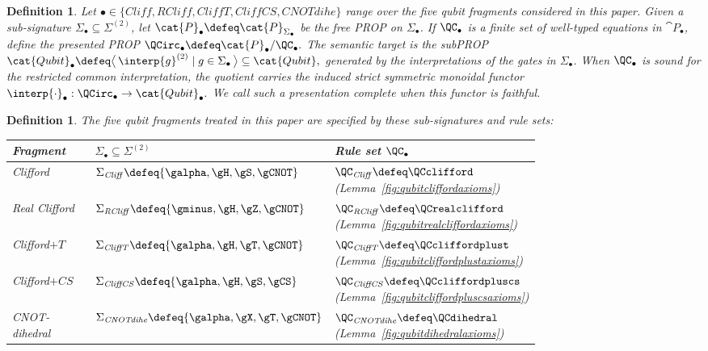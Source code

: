 \documentclass[10pt,a4paper]{article}
\newtheorem{definition}[theorem]{Definition}
\def\cref#1{Lemma~\ref{#1}}%
\begin{document}
\begin{definition}\label{def:qubit-fragment-scheme}
Let
\(
  \bullet \in \{\mathit{Cliff}, \mathit{RCliff}, \mathit{CliffT}, \mathit{CliffCS}, \mathit{CNOTdihe}\}
\)
range over the five qubit fragments considered in this paper.  Given a sub-signature \(\Sigma_\bullet\subseteq\Sigma^{(2)}\), let
\(\cat{P}_\bullet\defeq\cat{P}_{\Sigma_\bullet}\) be the free PROP on \(\Sigma_\bullet\).  If
\(\QC_\bullet\) is a finite set of well-typed equations in \(\cat{P}_\bullet\), define the presented
PROP
\(
  \QCirc_\bullet\defeq\cat{P}_\bullet/\QC_\bullet.
\)
The semantic target is the subPROP
\(
  \cat{Qubit}_\bullet
  \defeq
  \big\langle\,\interp{g}^{(2)} \mid g\in\Sigma_\bullet\,\big\rangle
  \subseteq
  \cat{Qubit},
\)
generated by the interpretations of the gates in \(\Sigma_\bullet\).  When \(\QC_\bullet\) is sound
for the restricted common interpretation, the quotient carries the induced strict symmetric
monoidal functor
\(
  \interp{\cdot}_\bullet:\QCirc_\bullet\to\cat{Qubit}_\bullet.
\)
We call such a presentation complete when this functor is faithful.
\end{definition}

\begin{definition}\label{def:qubit-fragments}
The five qubit fragments treated in this paper are specified by these sub-signatures and rule sets:
\begin{center}
\begin{tabular}{@{}l p{0.38\linewidth} p{0.38\linewidth}@{}}
\textbf{Fragment} & \(\Sigma_\bullet\subseteq\Sigma^{(2)}\) & \textbf{Rule set \(\QC_\bullet\)} \\
\hline
Clifford
& \(\Sigma_{\mathit{Cliff}}\defeq\{\galpha,\gH,\gS,\gCNOT\}\)
& \(\QC_{\mathit{Cliff}}\defeq\QCclifford\) (\cref{fig:qubitcliffordaxioms})
\\
Real Clifford
& \(\Sigma_{\mathit{RCliff}}\defeq\{\gminus,\gH,\gZ,\gCNOT\}\)
& \(\QC_{\mathit{RCliff}}\defeq\QCrealclifford\) (\cref{fig:qubitrealcliffordaxioms})
\\
Clifford\(+T\)
& \(\Sigma_{\mathit{CliffT}}\defeq\{\galpha,\gH,\gT,\gCNOT\}\)
& \(\QC_{\mathit{CliffT}}\defeq\QCcliffordplust\) (\cref{fig:qubitcliffordplustaxioms})
\\
Clifford\(+CS\)
& \(\Sigma_{\mathit{CliffCS}}\defeq\{\galpha,\gH,\gS,\gCS\}\)
& \(\QC_{\mathit{CliffCS}}\defeq\QCcliffordpluscs\) (\cref{fig:qubitcliffordpluscsaxioms})
\\
CNOT-dihedral
& \(\Sigma_{\mathit{CNOTdihe}}\defeq\{\galpha,\gX,\gT,\gCNOT\}\)
& \(\QC_{\mathit{CNOTdihe}}\defeq\QCdihedral\) (\cref{fig:qubitdihedralaxioms})
\end{tabular}
\end{center}
\end{definition}
\end{document}
